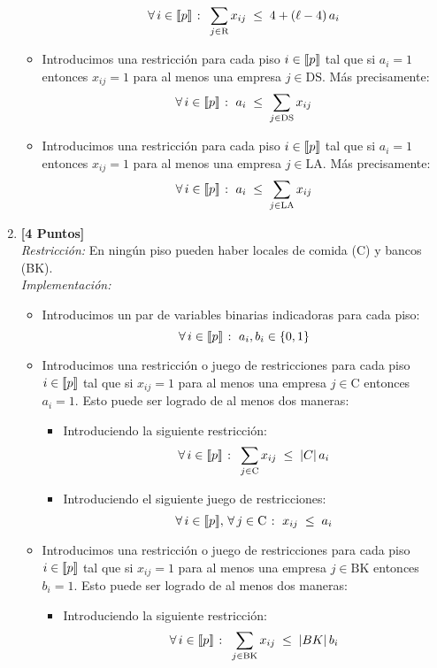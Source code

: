 \documentclass[ a4paper, twoside, 11pt]{article}
\begin{document}
\begin{problem}
\begin{enumerate}[label=\textbf{\alph*)}]
\begin{itemize}
\[
\forall \, i \in \llbracket p \rrbracket \; \colon \;
\sum_{ j \in \text{R} } x_{ij} \; \leq \; 4 + (\ell - 4) \, a_i
\]
\item Introducimos una restricci\'on para cada piso $i \in \llbracket p \rrbracket$ tal que si $a_i = 1$ entonces $x_{ij} = 1$ para al menos una empresa $j \in \text{DS}$. M\'as precisamente: 
\[
\forall \, i \in \llbracket p \rrbracket \; \colon \;
a_i \; \leq \; \sum_{j \in \text{DS}} x_{ij}
\]
\item Introducimos una restricci\'on para cada piso $i \in \llbracket p \rrbracket$ tal que si $a_i = 1$ entonces $x_{ij} = 1$ para al menos una empresa $j \in \text{LA}$. M\'as precisamente: 
\[
\forall \, i \in \llbracket p \rrbracket \; \colon \;
a_i \; \leq \; \sum_{j \in \text{LA}} x_{ij}
\]
\end{itemize}
\item \textbf{[4 Puntos]} \\[1ex]
\emph{Restricci\'on:} En ning\'un piso pueden haber locales de comida (C) y bancos (BK). \\[1ex]
\emph{Implementaci\'on:}
\begin{itemize}
\item Introducimos un par de variables binarias indicadoras para cada piso: 
\[
\forall \, i \in \llbracket p \rrbracket \; \colon \; a_i, b_i \in \{ 0, 1 \}
\]
\item Introducimos una restricci\'on o juego de restricciones para cada piso $i \in \llbracket p \rrbracket$ tal que si $x_{ij} = 1$ para al menos una empresa $j \in \text{C}$ entonces $a_i = 1$. Esto puede ser logrado de al menos dos maneras: 
\begin{itemize}
\item Introduciendo la siguiente restricci\'on: 
\[
\forall \, i \in \llbracket p \rrbracket \; \colon \;
\sum_{j \in \text{C}} x_{ij} \; \leq \; |C| \, a_i
\]
\item Introduciendo el siguiente juego de restricciones: 
\[
\forall \, i \in \llbracket p \rrbracket, \, \forall \, j \in \text{C} \; \colon \;
x_{ij} \; \leq \; a_i
\]
\end{itemize}
\item Introducimos una restricci\'on o juego de restricciones para cada piso $i \in \llbracket p \rrbracket$ tal que si $x_{ij} = 1$ para al menos una empresa $j \in \text{BK}$ entonces $b_i = 1$. Esto puede ser logrado de al menos dos maneras: 
\begin{itemize}
\item Introduciendo la siguiente restricci\'on: 
\[
\forall \, i \in \llbracket p \rrbracket \; \colon \;
\sum_{j \in \text{BK}} x_{ij} \; \leq \; |BK| \, b_i
\]
\end{itemize}
\end{itemize}
\end{enumerate}
\end{problem}
\end{document}
